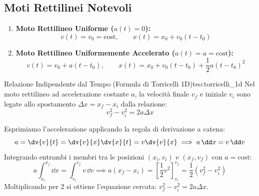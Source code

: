 \subsection{Moti Rettilinei Notevoli}

\begin{enumerate}
    \item \textbf{Moto Rettilineo Uniforme ($a(t) = 0$):}
    \begin{equation}
        v(t) = v_0 = \text{cost}, \qquad x(t) = x_0 + v_0(t - t_0)
    \end{equation}
    
    \item \textbf{Moto Rettilineo Uniformemente Accelerato ($a(t) = a = \text{cost}$):}
    \begin{equation}
        v(t) = v_0 + a(t - t_0), \qquad x(t) = x_0 + v_0(t - t_0) + \frac{1}{2}a(t - t_0)^2
        \label{eq:mrua}
    \end{equation}
\end{enumerate}

\begin{teorema}{Relazione Indipendente dal Tempo (Formula di Torricelli 1D)}{teo:torricelli_1d}
Nel moto rettilineo ad accelerazione costante $a$, la velocità finale $v_f$ e iniziale $v_i$ sono legate allo spostamento $\Delta x = x_f - x_i$ dalla relazione:
\begin{equation}
    v_f^2 - v_i^2 = 2 a \Delta x
    \label{eq:torricelli_1d}
\end{equation}
\end{teorema}

\begin{dimostrazione}
Esprimiamo l'accelerazione applicando la regola di derivazione a catena:
\begin{equation}
    a = \dv{v}{t} = \dv{v}{x}\dv{x}{t} = v \dv{v}{x} \implies a\,\dd x = v\,\dd v
\end{equation}
Integrando entrambi i membri tra le posizioni $(x_i, v_i)$ e $(x_f, v_f)$ con $a = \text{cost}$:
\begin{equation}
    a \int_{x_i}^{x_f} \dd x = \int_{v_i}^{v_f} v\,\dd v \implies a(x_f - x_i) = \left[\frac{1}{2}v^2\right]_{v_i}^{v_f} = \frac{1}{2}(v_f^2 - v_i^2)
\end{equation}
Moltiplicando per 2 si ottiene l'equazione cercata: $v_f^2 - v_i^2 = 2 a \Delta x$.
\end{dimostrazione}

